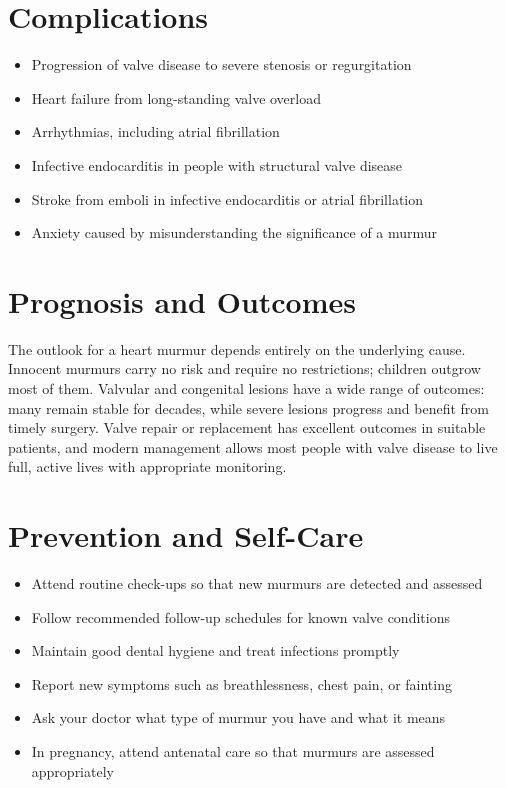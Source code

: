\section*{Complications}
\begin{itemize}
    \item Progression of valve disease to severe stenosis or regurgitation
    \item Heart failure from long-standing valve overload
    \item Arrhythmias, including atrial fibrillation
    \item Infective endocarditis in people with structural valve disease
    \item Stroke from emboli in infective endocarditis or atrial fibrillation
    \item Anxiety caused by misunderstanding the significance of a murmur
\end{itemize}

\section*{Prognosis and Outcomes}
The outlook for a heart murmur depends entirely on the underlying cause. Innocent murmurs carry no risk and require no restrictions; children outgrow most of them. Valvular and congenital lesions have a wide range of outcomes: many remain stable for decades, while severe lesions progress and benefit from timely surgery. Valve repair or replacement has excellent outcomes in suitable patients, and modern management allows most people with valve disease to live full, active lives with appropriate monitoring.

\section*{Prevention and Self-Care}
\begin{itemize}
    \item Attend routine check-ups so that new murmurs are detected and assessed
    \item Follow recommended follow-up schedules for known valve conditions
    \item Maintain good dental hygiene and treat infections promptly
    \item Report new symptoms such as breathlessness, chest pain, or fainting
    \item Ask your doctor what type of murmur you have and what it means
    \item In pregnancy, attend antenatal care so that murmurs are assessed appropriately
\end{itemize}


